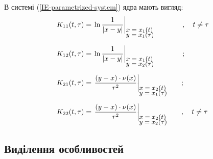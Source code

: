 \documentclass{beamer}
\numberwithin{equation}{section}
\begin{document}
	\begin{frame}
		В системі (\ref{IE-parametrized-system}) ядра мають вигляд:
		$$
		\begin{array}{l}
			\displaystyle
			K_{11}(t, \tau) = \left.
			\ln{\frac{1}{\abs{x - y}}}
			\right|_{
				{\small \parbox{20mm}{$ x = x_1(t)$ \\[-4pt] $y = x_1 ({\tau})$}}
			} \quad \quad, \quad t \neq \tau
			\\ [0.8cm]
			
			\displaystyle
			K_{12}(t, \tau) = \left.
			\ln{\frac{1}{\abs{x - y}}}
			\right|_{
				{\small \parbox{20mm}{$ x = x_1(t)$ \\[-4pt] $y = x_2 ({\tau})$}}
			} \quad \quad;
			\\ [0.8cm]
			
			\displaystyle
			K_{21}(t, \tau) = \left.
			\frac{(y - x) \cdot \nu(x)}{r^2}
			\right|_{
				{\small \parbox{20mm}{$ x = x_2(t)$ \\[-4pt] $y = x_1 ({\tau})$}}
			};
			\\ [0.8cm]
			
			\displaystyle
			K_{22}(t, \tau) = \left.
			\frac{(y - x) \cdot \nu(x)}{r^2}
			\right|_{
				{\small \parbox{20mm}{$ x = x_2(t)$ \\[-4pt] $y = x_2 ({\tau})$}}
			} 
			, \quad t \neq \tau
		\end{array}
		$$		
	\end{frame}
	

	\subsection{Виділення особливостей} 

	
\end{document}
